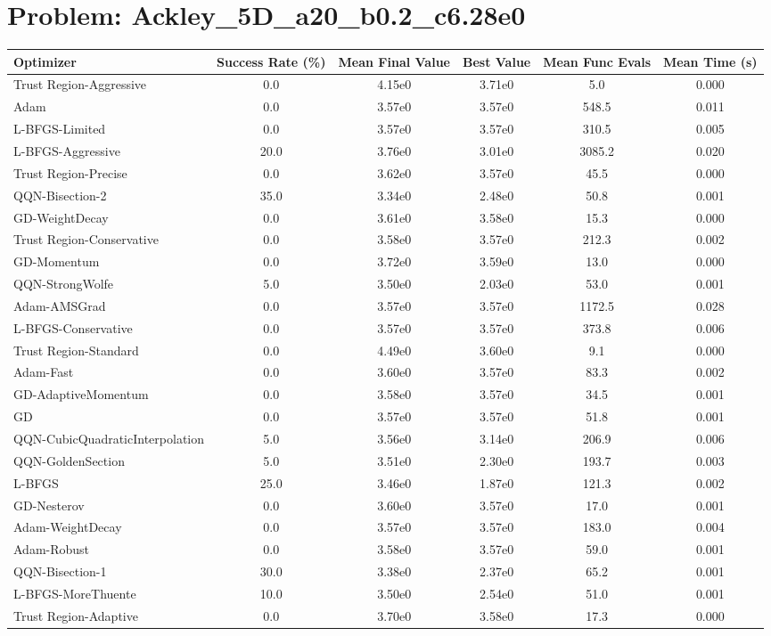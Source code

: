 \documentclass{article}
\begin{document}
\section{Problem: Ackley\_5D\_a20\_b0.2\_c6.28e0}
\begin{longtable}{p{3cm}*{5}{c}}
\toprule
\textbf{Optimizer} & \textbf{Success Rate (\%)} & \textbf{Mean Final Value} & \textbf{Best Value} & \textbf{Mean Func Evals} & \textbf{Mean Time (s)} \\
\midrule
Trust Region-Aggressive & 0.0 & 4.15e0 & 3.71e0 & 5.0 & 0.000 \\
Adam & 0.0 & 3.57e0 & 3.57e0 & 548.5 & 0.011 \\
L-BFGS-Limited & 0.0 & 3.57e0 & 3.57e0 & 310.5 & 0.005 \\
L-BFGS-Aggressive & 20.0 & 3.76e0 & 3.01e0 & 3085.2 & 0.020 \\
Trust Region-Precise & 0.0 & 3.62e0 & 3.57e0 & 45.5 & 0.000 \\
QQN-Bisection-2 & 35.0 & 3.34e0 & 2.48e0 & 50.8 & 0.001 \\
GD-WeightDecay & 0.0 & 3.61e0 & 3.58e0 & 15.3 & 0.000 \\
Trust Region-Conservative & 0.0 & 3.58e0 & 3.57e0 & 212.3 & 0.002 \\
GD-Momentum & 0.0 & 3.72e0 & 3.59e0 & 13.0 & 0.000 \\
QQN-StrongWolfe & 5.0 & 3.50e0 & 2.03e0 & 53.0 & 0.001 \\
Adam-AMSGrad & 0.0 & 3.57e0 & 3.57e0 & 1172.5 & 0.028 \\
L-BFGS-Conservative & 0.0 & 3.57e0 & 3.57e0 & 373.8 & 0.006 \\
Trust Region-Standard & 0.0 & 4.49e0 & 3.60e0 & 9.1 & 0.000 \\
Adam-Fast & 0.0 & 3.60e0 & 3.57e0 & 83.3 & 0.002 \\
GD-AdaptiveMomentum & 0.0 & 3.58e0 & 3.57e0 & 34.5 & 0.001 \\
GD & 0.0 & 3.57e0 & 3.57e0 & 51.8 & 0.001 \\
QQN-CubicQuadraticInterpolation & 5.0 & 3.56e0 & 3.14e0 & 206.9 & 0.006 \\
QQN-GoldenSection & 5.0 & 3.51e0 & 2.30e0 & 193.7 & 0.003 \\
L-BFGS & 25.0 & 3.46e0 & 1.87e0 & 121.3 & 0.002 \\
GD-Nesterov & 0.0 & 3.60e0 & 3.57e0 & 17.0 & 0.001 \\
Adam-WeightDecay & 0.0 & 3.57e0 & 3.57e0 & 183.0 & 0.004 \\
Adam-Robust & 0.0 & 3.58e0 & 3.57e0 & 59.0 & 0.001 \\
QQN-Bisection-1 & 30.0 & 3.38e0 & 2.37e0 & 65.2 & 0.001 \\
L-BFGS-MoreThuente & 10.0 & 3.50e0 & 2.54e0 & 51.0 & 0.001 \\
Trust Region-Adaptive & 0.0 & 3.70e0 & 3.58e0 & 17.3 & 0.000 \\
\bottomrule
\end{longtable}
\end{document}
